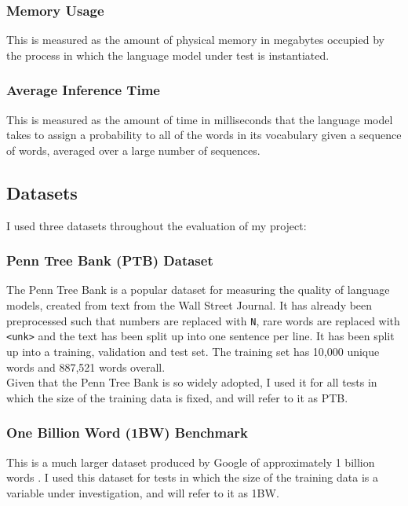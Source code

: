 \documentclass[a4paper, 12pt]{report}
\newcommand{\ttt}[1]{\texttt{#1}}
\begin{document}
\subsubsection{Memory Usage}

This is measured as the amount of physical memory in megabytes occupied by the process in which the language model under test is instantiated.

\subsubsection{Average Inference Time}

This is measured as the amount of time in milliseconds that the language model takes to assign a probability to all of the words in its vocabulary given a sequence of words, averaged over a large number of sequences.

\subsection{Datasets}

I used three datasets throughout the evaluation of my project:

\subsubsection{Penn Tree Bank (PTB) Dataset}

The Penn Tree Bank is a popular dataset for measuring the quality of language models, created from text from the Wall Street Journal. It has already been preprocessed such that numbers are replaced with \ttt{N}, rare words are replaced with \ttt{<unk>} and the text has been split up into one sentence per line. It has been split up into a training, validation and test set. The training set has 10,000 unique words and 887,521 words overall. \\

Given that the Penn Tree Bank is so widely adopted, I used it for all tests in which the size of the training data is fixed, and will refer to it as PTB.

\subsubsection{One Billion Word (1BW) Benchmark}

This is a much larger dataset produced by Google of approximately 1 billion words \cite{1bw:chelba2013}. I used this dataset for tests in which the size of the training data is a variable under investigation, and will refer to it as 1BW.
\end{document}
